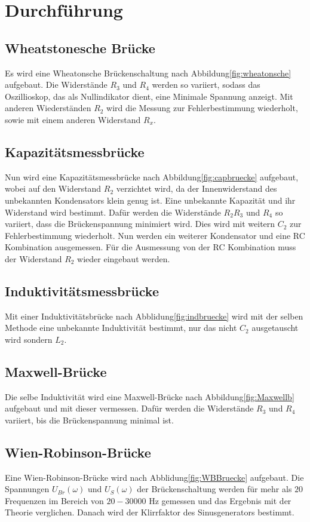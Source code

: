 \section{Durchführung}
\label{sec:Durchführung}
\subsection{Wheatstonesche Brücke}
Es wird eine Wheatonsche Brückenschaltung nach Abbildung\ref{fig:wheatonsche}
aufgebaut. Die Widerstände $R_3$ und $R_4$ werden so variiert, sodass das
Oszillioskop, das als Nullindikator dient, eine Minimale Spannung anzeigt.
Mit anderen Wiederständen $R_2$ wird die Messung zur Fehlerbestimmung wiederholt,
sowie mit einem anderen Widerstand $R_x$.
\subsection{Kapazitätsmessbrücke}
Nun wird eine Kapazitätsmessbrücke nach Abbildung\ref{fig:capbruecke} aufgebaut,
wobei auf den Widerstand $R_2$ verzichtet wird, da der Innenwiderstand des
unbekannten Kondensators klein genug ist.
Eine unbekannte Kapazität und ihr Widerstand wird bestimmt. Dafür werden die
Widerstände $R_2R_3$ und $R_4$ so variiert, dass die Brückenspannung minimiert
wird. Dies wird mit weitern $C_2$ zur Fehlerbestimmung wiederholt. Nun werden
ein weiterer Kondensator und eine RC Kombination ausgemessen. Für die Ausmessung
von der RC Kombination muss der Widerstand $R_2$ wieder eingebaut werden.
\subsection{Induktivitätsmessbrücke}
Mit einer Induktivitätsbrücke nach Abblidung\ref{fig:indbruecke} wird mit der
selben Methode eine unbekannte Induktivität bestimmt, nur das nicht $C_2$
ausgetauscht wird sondern $L_2$.
\subsection{Maxwell-Brücke}
Die selbe Induktivität wird eine Maxwell-Brücke nach Abbildung\ref{fig:Maxwellb}
aufgebaut und mit dieser vermessen. Dafür werden die Widerstände $R_3$ und $R_4$
variiert, bis die Brückenspannung minimal ist.
\subsection{Wien-Robinson-Brücke}
Eine Wien-Robinson-Brücke wird nach Abblidung\ref{fig:WBBruecke} aufgebaut. Die
Spannungen $U_{Br}(\omega)$ und $U_{S}(\omega)$ der Brückenschaltung werden für
mehr als $20$ Frequenzen im Bereich von $20-30000$ Hz gemessen und das Ergebnis
mit der Theorie verglichen. Danach wird der Klirrfaktor des Sinusgenerators bestimmt.
